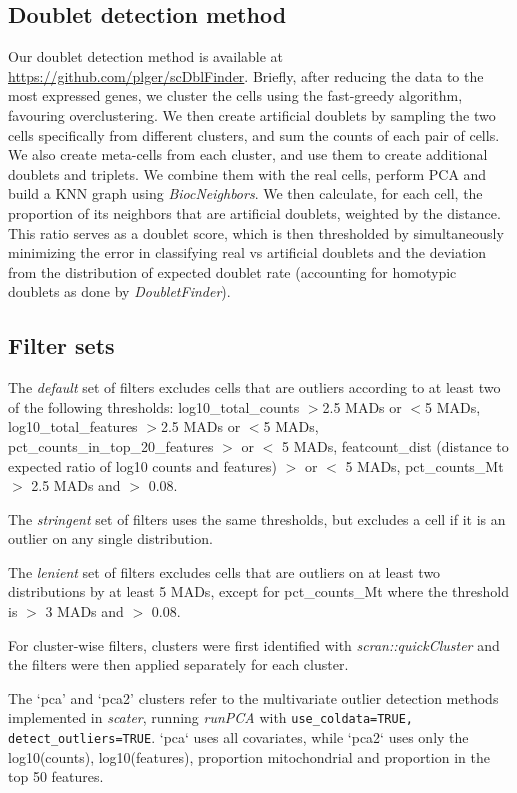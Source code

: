 \documentclass{bmcart}
\begin{document}
\subsection*{Doublet detection method}
Our doublet detection method is available at \url{https://github.com/plger/scDblFinder}. Briefly, after reducing the data to the most expressed genes, we cluster the cells using the fast-greedy algorithm, favouring overclustering. We then create artificial doublets by sampling the two cells specifically from different clusters, and sum the counts of each pair of cells. We also create meta-cells from each cluster, and use them to create additional doublets and triplets. We combine them with the real cells, perform PCA and build a KNN graph using \textit{BiocNeighbors}. We then calculate, for each cell, the proportion of its neighbors that are artificial doublets, weighted by the distance. This ratio serves as a doublet score, which is then thresholded by simultaneously minimizing the error in classifying real vs artificial doublets and the deviation from the distribution of expected doublet rate (accounting for homotypic doublets as done by \textit{DoubletFinder}).

\subsection*{Filter sets}
The \textit{default} set of filters excludes cells that are outliers according to at least two of the following thresholds: log10\_total\_counts $>$2.5 MADs or $<$5 MADs, log10\_total\_features $>$2.5 MADs or $<$5 MADs, pct\_counts\_in\_top\_20\_features $>$ or $<$ 5 MADs, featcount\_dist (distance to expected ratio of log10 counts and features) $>$ or $<$ 5 MADs, pct\_counts\_Mt $>$ 2.5 MADs and $>$ 0.08.

The \textit{stringent} set of filters uses the same thresholds, but excludes a cell if it is an outlier on any single distribution. 

The \textit{lenient} set of filters excludes cells that are outliers on at least two distributions by at least 5 MADs, except for pct\_counts\_Mt where the threshold is $>$ 3 MADs and $>$ 0.08.

For cluster-wise filters, clusters were first identified with \textit{scran::quickCluster} and the filters were then applied separately for each cluster. 

The `pca' and `pca2' clusters refer to the multivariate outlier detection methods implemented in \textit{scater}, running \textit{runPCA} with \texttt{use\_coldata=TRUE, detect\_outliers=TRUE}. `pca` uses all covariates, while `pca2` uses only the log10(counts), log10(features), proportion mitochondrial and proportion in the top 50 features.
\end{document}
